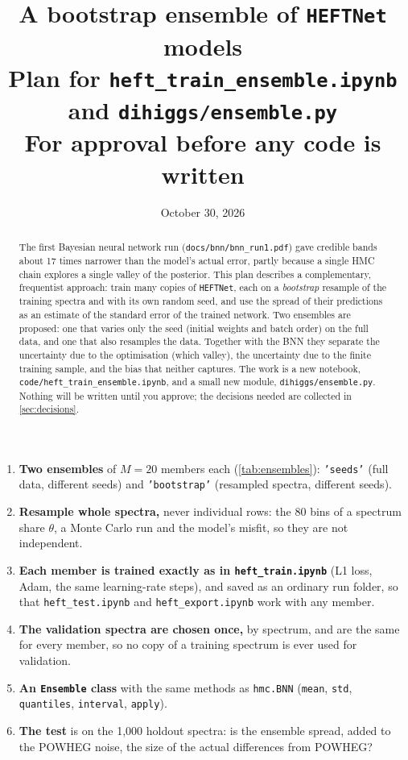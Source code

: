 \documentclass[11pt]{article}
\title{\textbf{A bootstrap ensemble of \texttt{HEFTNet} models}\\[4pt]
\large Plan for \texttt{heft\_train\_ensemble.ipynb} and \texttt{dihiggs/ensemble.py}\\[4pt]
\normalsize For approval before any code is written}
\date{October 30, 2026}
\newcommand{\file}[1]{\nolinkurl{#1}}
\newcommand{\code}[1]{\texttt{#1}}
\begin{document}
\maketitle

\begin{abstract}
\noindent
The first Bayesian neural network run (\file{docs/bnn/bnn_run1.pdf}) gave credible
bands about 17 times narrower than the model's actual error, partly because a single
HMC chain explores a single valley of the posterior. This plan describes a
complementary, frequentist approach: train many copies of \code{HEFTNet}, each on a
\emph{bootstrap} resample of the training spectra and with its own random seed, and use
the spread of their predictions as an estimate of the standard error of the trained
network. Two ensembles are proposed: one that varies only the seed (initial weights and
batch order) on the full data, and one that also resamples the data. Together with the
BNN they separate the uncertainty due to the optimisation (which valley), the
uncertainty due to the finite training sample, and the bias that neither captures. The
work is a new notebook, \file{code/heft_train_ensemble.ipynb}, and a small new module,
\file{dihiggs/ensemble.py}. Nothing will be written until you approve; the decisions
needed are collected in \cref{sec:decisions}.
\end{abstract}

\begin{keyidea}
\begin{enumerate}
  \item \textbf{Two ensembles} of $M = 20$ members each (\cref{tab:ensembles}):
    \code{'seeds'} (full data, different seeds) and \code{'bootstrap'} (resampled
    spectra, different seeds).
  \item \textbf{Resample whole spectra,} never individual rows: the 80 bins of a spectrum
    share $\theta$, a Monte Carlo run and the model's misfit, so they are not independent.
  \item \textbf{Each member is trained exactly as in \file{heft_train.ipynb}} (L1 loss,
    Adam, the same learning-rate steps), and saved as an ordinary run folder, so that
    \file{heft_test.ipynb} and \file{heft_export.ipynb} work with any member.
  \item \textbf{The validation spectra are chosen once,} by spectrum, and are the same for
    every member, so no copy of a training spectrum is ever used for validation.
  \item \textbf{An \code{Ensemble} class} with the same methods as \code{hmc.BNN}
    (\code{mean}, \code{std}, \code{quantiles}, \code{interval}, \code{apply}).
  \item \textbf{The test} is on the 1,000 holdout spectra: is the ensemble spread, added
    to the POWHEG noise, the size of the actual differences from POWHEG?
\end{enumerate}
\end{keyidea}
\end{document}
